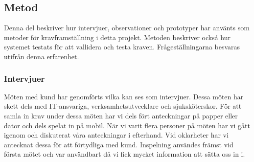 \subsection{Metod}
Denna del beskriver hur intervjuer, observationer och prototyper har använts som metoder för kravframställning i detta projekt. Metoden beskriver också hur systemet testats för att vallidera och testa kraven. Frågeställningarna besvaras utifrån denna erfarenhet.
\subsubsection{Intervjuer}
Möten med kund har genomförts vilka kan ses som intervjuer. Dessa möten har skett dels med IT-ansvariga, verksamhetsutvecklare och sjuksköterskor. För att samla in krav under dessa möten har vi dels fört anteckningar på papper eller dator och dels spelat in på mobil. När vi varit flera personer på möten har vi gått igenom och diskuterat våra anteckningar i efterhand. Vid oklarheter har vi antecknat dessa för att förtydliga med kund. Inspelning användes främst vid första mötet och var användbart då vi fick mycket information att sätta oss in i. 

